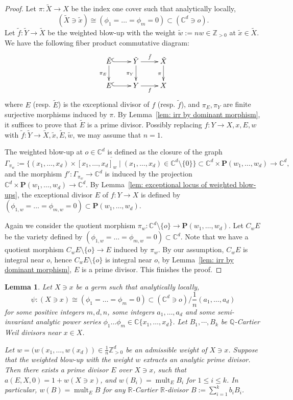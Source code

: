 \documentclass[11pt]{amsart}
\numberwithin{equation}{section}
\newcommand{\Cc}{\mathbb{C}}
\newcommand{\Qq}{\mathbb{Q}}
\newcommand{\Rr}{\mathbb{R}}
\newcommand{\Zz}{\mathbb{Z}}
\newcommand{\mult}{\operatorname{mult}}
\newcommand{\Ii}{{\Gamma}}
\newtheorem{lem}[thm]{Lemma}
\theoremstyle{definition}
\theoremstyle{definition}
\begin{document}
\begin{proof}
Let $\pi: \tilde{X}\to X$ be the index one cover such that analytically locally, $$(\tilde{X}\ni \tilde{x})\cong (\phi_1=\dots =\phi_m=0)\subset (\mathbb C^d\ni o).$$ Let $\tilde{f}: \tilde{Y}\to \tilde{X}$ be the weighted blow-up with the weight $\tilde{w}:=nw\in \Zz_{>0}$ at $\tilde{x}\in \tilde{X}$. We have the following fiber product commutative diagram:
$$\xymatrix@R=2em{\tilde{E} \ar[d]_{\pi_E} \ar@{^{(}->}[r]
 &\tilde{Y} \ar[d]_{\pi_Y} \ar[r]^{\tilde{f}} &   \tilde{X} \ar[d]_{\pi}\\
 E \ar@{^{(}->}[r]
 & Y \ar[r]_{f} & X
}
$$
where $E$ (resp. $\tilde{E}$) is the exceptional divisor of $f$ (resp. $\tilde{f}$), and $\pi_E,\pi_Y$ are finite surjective morphisms induced by $\pi$. By Lemma~\ref{lem: irr by dominant morphism}, it suffices to prove that $\tilde{E}$ is a prime divisor. Possibly replacing $f: Y\to X,x, E, w$ with $\tilde{f}: \tilde{Y}\to \tilde{X},\tilde{x},\tilde{E}, \tilde{w}$, we may assume that $n=1$.

\medskip

The weighted blow-up at $o\in \Cc^d$ is defined as the closure of the graph $$\Ii_{\pi_w}:=\overline{\{(x_1,\dots,x_d)\times[x_1,\dots,x_d]_w\mid (x_1,\dots,x_d)\in \Cc^d\setminus\{0\}\}}\subset \Cc^d\times \mathbf{P}(w_1,\dots,w_d)\to \Cc^d,$$ and the morphism $f': \Ii_{\pi_w}\to \Cc^d$ is induced by the projection $\Cc^d\times \mathbf{P}(w_1,\dots,w_d)\to \Cc^d$. By Lemma~\ref{lem: exceptional locus of weighted blow-ups}, the exceptional divisor $E$ of $f: Y\to X$ is defined by $(\phi_{1,w}=\dots =\phi_{m,w}=0)\subset \mathbf{P}(w_1,\dots,w_d)$.


Again we consider the quotient morphism $\pi_w: \Cc^d\setminus\{o\}\to \mathbf{P}(w_1,\dots,w_d)$. Let $C_{w}E$ be the variety defined by $(\phi_{1,w}=\dots =\phi_{m,w}=0)\subset \Cc^d$. Note that we have a quotient morphism $C_wE\setminus\{o\}\to E$ induced by $\pi_w$. By our assumption, $C_wE$ is integral near $o$, hence $C_wE\setminus \{o\}$ is integral near $o$, by Lemma~\ref{lem: irr by dominant morphism}, $E$ is a prime divisor. This finishes the proof.
\end{proof}


\begin{lem}\label{lem: algebraic approximation of weighted blow-up}
Let $X\ni x$ be a germ such that analytically locally,
$$\psi:(X\ni x)\cong (\phi_1=\dots =\phi_m=0)\subset (\mathbb C^d\ni o)/\frac{1}{n}(a_1,\dots,a_d)$$ for some positive integers $m,d,n$, some integers $a_1,\dots,a_d$ and some \emph{semi-invariant} analytic power series $\phi_1\dots\phi_m\in\Cc\{x_1,\dots,x_d\}$. Let $B_1,\cdots, B_k$ be $\Qq$-Cartier Weil divisors near $x\in X$.

Let $w=(w(x_1,\dots,w(x_d))\in \frac{1}{n}\Zz^d_{>0}$ be an admissible weight of $X\ni x$. Suppose that the weighted blow-up with the weight $w$ extracts an analytic prime divisor. Then there exists a prime divisor $E$ over $X\ni x$, such that $a(E,X,0)=1+w(X\ni x)$, and $w(B_i)=\mult_E B_i$ for $1\leq i\leq k$. In particular, $w(B)=\mult_E B$ for any $\Rr$-Cartier $\Rr$-divisor $B:=\sum_{i=1}^k b_iB_i$.
\end{lem}
\end{document}
